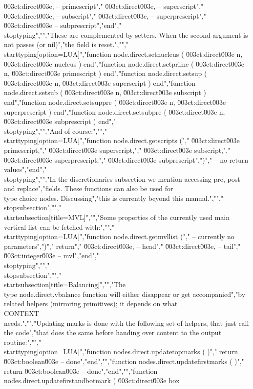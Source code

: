 \u003ct:direct\u003e, -- primescript","        \u003ct:direct\u003e, -- superscript","        \u003ct:direct\u003e, -- subscript","        \u003ct:direct\u003e, -- superprescript","        \u003ct:direct\u003e  -- subprescript","end","\\stoptyping","","These are complemented by setters. When the second argument is not passes (or nil)","the field is reset.","","\\starttyping[option=LUA]","function node.direct.setnucleus ( \u003ct:direct\u003e n, \u003ct:direct\u003e nucleus        ) end","function node.direct.setprime   ( \u003ct:direct\u003e n, \u003ct:direct\u003e primescript    ) end","function node.direct.setsup     ( \u003ct:direct\u003e n, \u003ct:direct\u003e superscript    ) end","function node.direct.setsub     ( \u003ct:direct\u003e n, \u003ct:direct\u003e subscript      ) end","function node.direct.setsuppre  ( \u003ct:direct\u003e n, \u003ct:direct\u003e superprescript ) end","function node.direct.setsubpre  ( \u003ct:direct\u003e n, \u003ct:direct\u003e subprescript   ) end","\\stoptyping","","And of course:","","\\starttyping[option=LUA]","function node.direct.getscripts (","    \u003ct:direct\u003e primescript,","    \u003ct:direct\u003e superscript,","    \u003ct:direct\u003e subscript,","    \u003ct:direct\u003e superprescript,","    \u003ct:direct\u003e subprescript",")","    -- no return values","end","\\stoptyping","","In the discretionaries subsection we mention accessing pre, post and replace","fields. These functions can also be used for \\type {choice} nodes. Discussing","this is currently beyond this manual.","","\\stopsubsection","","\\startsubsection[title={MVL}]","","Some properties of the currently used main vertical list can be fetched with:","","\\starttyping[option=LUA]","function node.direct.getmvllist (","    -- currently no parameters",")","    return","        \u003ct:direct\u003e,  -- head","        \u003ct:direct\u003e,  -- tail","        \u003ct:integer\u003e -- mvl","end","\\stoptyping","","\\stopsubsection","","\\startsubsection[title={Balancing}]","","The \\type {node.direct.vbalance} function will either disappear or get accompanied","by related helpers (mirroring primitives); it depends on what \\CONTEXT\\ needs.","","Updating marks is done with the following set of helpers, that just call the code","that does the same before handing over content to the output routine:","","\\starttyping[option=LUA]","function nodes.direct.updatetopmarks ( )","    return \u003ct:boolean\u003e -- done","end","","function nodes.direct.updatefirstmarks ( )","    return \u003ct:boolean\u003e -- done","end","","function nodes.direct.updatefirstandbotmark ( \u003ct:direct\u003e box 